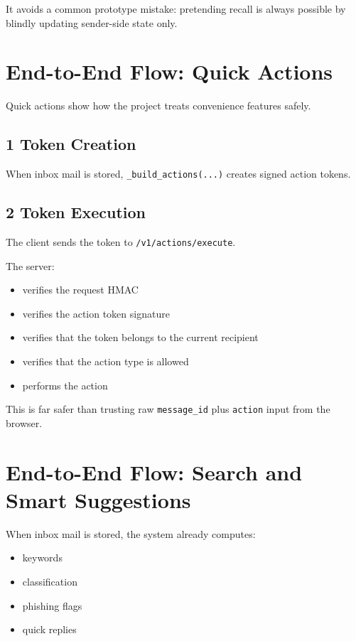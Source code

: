 \documentclass[11pt,a4paper]{article}
\begin{document}
It avoids a common prototype mistake: pretending recall is always possible by blindly updating sender-side state only.


\section{End-to-End Flow: Quick Actions}

Quick actions show how the project treats convenience features safely.

\subsection{1 Token Creation}

When inbox mail is stored, \nolinkurl{_build_actions(...)} creates signed action tokens.

\subsection{2 Token Execution}

The client sends the token to \nolinkurl{/v1/actions/execute}.

The server:

\begin{itemize}
\item verifies the request HMAC
\item verifies the action token signature
\item verifies that the token belongs to the current recipient
\item verifies that the action type is allowed
\item performs the action
\end{itemize}

This is far safer than trusting raw \nolinkurl{message_id} plus \nolinkurl{action} input from the browser.


\section{End-to-End Flow: Search and Smart Suggestions}

When inbox mail is stored, the system already computes:

\begin{itemize}
\item keywords
\item classification
\item phishing flags
\item quick replies
\end{itemize}
\end{document}
